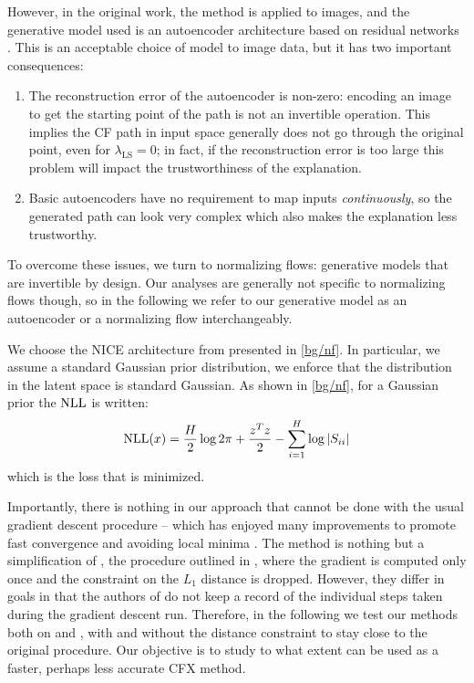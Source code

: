 \documentclass[../main.tex]{subfiles}
\begin{document}
However, in the original \ls{} work, the method is applied to images, and the generative model used is an autoencoder architecture based on residual networks \cite{heDeep2015}.
This is an acceptable choice of model to image data, but it has two important consequences:
\begin{enumerate}
	\item The reconstruction error of the autoencoder is non-zero: encoding an image to get the starting point of the path is not an invertible operation.
	      This implies the CF path in input space generally does not go through the original point, even for $\lambda_\text{LS} = 0$; in fact, if the reconstruction error is too large this problem will impact the trustworthiness of the explanation.

	\item Basic autoencoders have no requirement to map inputs \emph{continuously}, so the generated path can look very complex which also makes the explanation less trustworthy.
\end{enumerate}

To overcome these issues, we turn to normalizing flows: generative models that are invertible by design.
Our analyses are generally not specific to normalizing flows though, so in the following we refer to our generative model as an autoencoder or a normalizing flow interchangeably.

We choose the NICE architecture from \cite{dinhNICE2015} presented in \autoref{bg/nf}.
In particular, we assume a standard Gaussian prior distribution, \ie{} we enforce that the distribution in the latent space is standard Gaussian.
As shown in \autoref{bg/nf}, for a Gaussian prior the $\text{NLL}$ is written:
\begin{align*}
\text{NLL}(x) = \frac{H}{2} \log 2 \pi
    +  \frac{z^T z}{2}
    - \sum_{i=1}^H \log \left\lvert S_{ii}\right\rvert
\end{align*}
which is the loss that is minimized.

Importantly, there is nothing in our approach that cannot be done with the usual gradient descent procedure --
which has enjoyed many improvements to promote fast convergence and avoiding local minima \cite{kingmaAdam2014}.
The \ls{} method is nothing but a simplification of \revise{}, the procedure outlined in \cite{joshiRealistic2019},
where the gradient is computed only once and the constraint on the $L_1$ distance is dropped.
However, they differ in goals in that the authors of \cite{joshiRealistic2019} do not keep a record of the individual
steps taken during the gradient descent run.
Therefore, in the following we test our methods both on \ls{} and \revise{}, with and without the distance constraint
to stay close to the original \revise{} procedure.
Our objective is to study to what extent \ls{} can be used as a faster, perhaps less accurate CFX method.
\end{document}
